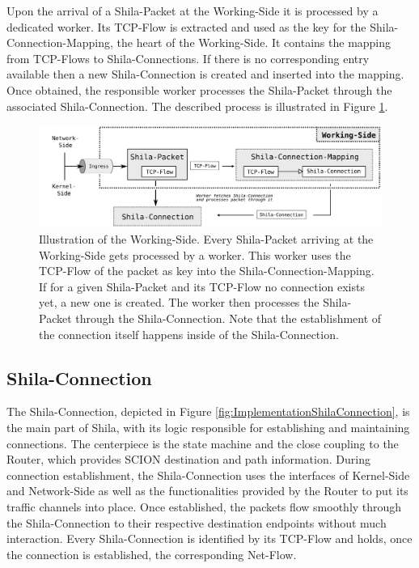 Upon the arrival of a Shila-Packet at the Working-Side it is processed by a dedicated worker. Its TCP-Flow is extracted and used as the key for the Shila-Connection-Mapping, the heart of the Working-Side. It contains the mapping from TCP-Flows to Shila-Connections. If there is no corresponding entry available then a new Shila-Connection is created and inserted into the mapping. Once obtained, the responsible worker processes the Shila-Packet through the associated Shila-Connection. The described process is illustrated in Figure \ref{fig:ImplementationProcessWorkingSide}. 

\begin{figure}
	\begin{center}
		\def\svgwidth{1\textwidth}
		\includegraphics[scale=0.2]{../illustrations/implementation/ProcessWorkingSide.pdf}   
		\caption[]{Illustration of the Working-Side. Every Shila-Packet arriving at the Working-Side gets processed by a worker. This worker uses the TCP-Flow of the packet as key into the Shila-Connection-Mapping. If for a given Shila-Packet and its TCP-Flow no connection exists yet, a new one is created. The worker then processes the Shila-Packet through the Shila-Connection. Note that the establishment of the connection itself happens inside of the Shila-Connection.}
		\label{fig:ImplementationProcessWorkingSide}
	\end{center}
\end{figure}

\subsection*{Shila-Connection}

The Shila-Connection, depicted in Figure \ref{fig:ImplementationShilaConnection}, is the main part of Shila, with its logic responsible for establishing and maintaining connections. The centerpiece is the state machine and the close coupling to the Router, which provides SCION destination and path information. During connection establishment, the Shila-Connection uses the interfaces of Kernel-Side and Network-Side as well as the functionalities provided by the Router to put its traffic channels into place. Once established, the packets flow smoothly through the Shila-Connection to their respective destination endpoints without much interaction. Every Shila-Connection is identified by its TCP-Flow and holds, once the connection is established, the corresponding Net-Flow.

